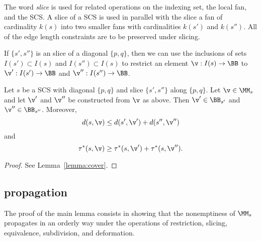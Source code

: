 The word {\it slice} is used for related operations on the indexing
set, the local fan, and the SCS.  A slice of a
SCS is used in parallel with the slice a fan of
cardinality $k(s)$ into two smaller fans with cardinalities $k(s')$ and
$k(s'')$.  
All of the edge length constraints are to be preserved
under slicing.  

If $\{s',s''\}$ is an slice of a diagonal $\{p,q\}$, then we can use
the inclusions of sets $I(s')\subset I(s)$ and $I(s'')\subset I(s)$ to
restrict an element $\v:I(s)\to\BB$ to $\v':I(s')\to \BB$ and
$\v'':I(s'')\to \BB$.  

\begin{lemma}\label{lemma:cover2}
Let $s$ be a SCS with diagonal $\{p,q\}$ and slice
 $\{s',s''\}$ along $\{p,q\}$.
Let $\v\in \MM_s$ and let $\v'$ and $\v''$ be constructed from $\v$ as above.
Then  $\v'\in \BB_{s'}$ and $\v''\in \BB_{s''}$.
Moreover,
\begin{equation}
d(s,\v) \le d(s',\v') + d(s'',\v'')
\end{equation}
and
\begin{equation}
\tau^*(s,\v)\ge \tau^*(s,\v')+\tau^*(s,\v'').
\end{equation}
\end{lemma}

\begin{proof} See Lemma~\ref{lemma:cover}.
\end{proof}

\subsection{propagation}

The proof of the main lemma consists in showing that the nonemptiness
of $\MM_s$ propagates in an orderly way under the operations of
restriction, slicing, equivalence, subdivision, and deformation.


